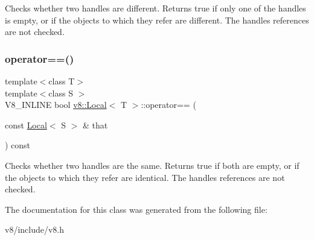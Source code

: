 Checks whether two handles are different. Returns true if only one of the handles is empty, or if the objects to which they refer are different. The handles\textquotesingle{} references are not checked. \mbox{\label{classv8_1_1Local_a0dfaa25015487674f568a4e1cd0be48c}} 
\subsubsection{\texorpdfstring{operator==()}{operator==()}}
{\footnotesize\ttfamily template$<$class T$>$ \\
template$<$class S $>$ \\
V8\+\_\+\+I\+N\+L\+I\+NE bool \mbox{\hyperlink{classv8_1_1Local}{v8\+::\+Local}}$<$ T $>$\+::operator== (\begin{DoxyParamCaption}\item[{const \mbox{\hyperlink{classv8_1_1Local}{Local}}$<$ S $>$ \&}]{that }\end{DoxyParamCaption}) const\hspace{0.3cm}{\ttfamily [inline]}}

Checks whether two handles are the same. Returns true if both are empty, or if the objects to which they refer are identical. The handles\textquotesingle{} references are not checked. 

The documentation for this class was generated from the following file\+:\begin{DoxyCompactItemize}
\item 
v8/include/v8.\+h\end{DoxyCompactItemize}

